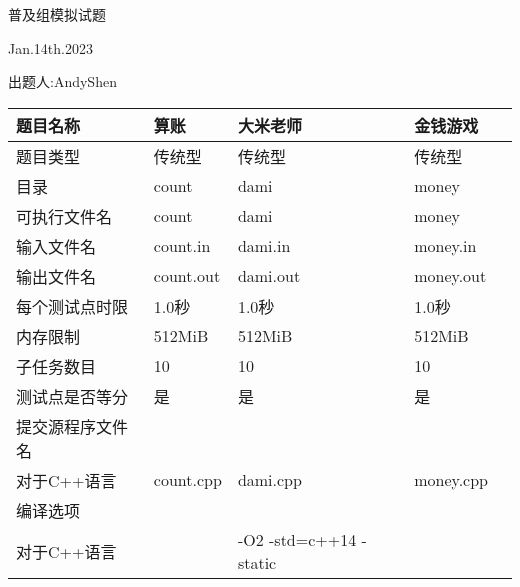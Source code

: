 \documentclass[final,11pt,oneside,UTF8]{report}
\begin{document}
\centerline{\LARGE{普及组模拟试题}}
\centerline{}
\centerline{\LARGE{Jan.14th.2023}}
\centerline{}
\centerline{出题人:AndyShen}
\centerline{}
\begin{table}[h]
    \centering
    \begin{tabular}{lllll}
        \hline
        \multicolumn{1}{|l|}{题目名称}    & \multicolumn{1}{l|}{算账}        & \multicolumn{1}{l|}{大米老师}                  & \multicolumn{1}{l|}{金钱游戏}      \\ \hline
        \multicolumn{1}{|l|}{题目类型}    & \multicolumn{1}{l|}{传统型}       & \multicolumn{1}{l|}{传统型}                   & \multicolumn{1}{l|}{传统型}       \\ \hline
        \multicolumn{1}{|l|}{目录}      & \multicolumn{1}{l|}{count}     & \multicolumn{1}{l|}{dami}                  & \multicolumn{1}{l|}{money}     \\ \hline
        \multicolumn{1}{|l|}{可执行文件名}  & \multicolumn{1}{l|}{count}     & \multicolumn{1}{l|}{dami}                  & \multicolumn{1}{l|}{money}     \\ \hline
        \multicolumn{1}{|l|}{输入文件名}   & \multicolumn{1}{l|}{count.in}  & \multicolumn{1}{l|}{dami.in}               & \multicolumn{1}{l|}{money.in}  \\ \hline
        \multicolumn{1}{|l|}{输出文件名}   & \multicolumn{1}{l|}{count.out} & \multicolumn{1}{l|}{dami.out}              & \multicolumn{1}{l|}{money.out} \\ \hline
        \multicolumn{1}{|l|}{每个测试点时限} & \multicolumn{1}{l|}{1.0秒}      & \multicolumn{1}{l|}{1.0秒}                  & \multicolumn{1}{l|}{1.0秒}      \\ \hline
        \multicolumn{1}{|l|}{内存限制}    & \multicolumn{1}{l|}{512MiB}    & \multicolumn{1}{l|}{512MiB}                & \multicolumn{1}{l|}{512MiB}    \\ \hline
        \multicolumn{1}{|l|}{子任务数目}   & \multicolumn{1}{l|}{10}        & \multicolumn{1}{l|}{10}                    & \multicolumn{1}{l|}{10}        \\ \hline
        \multicolumn{1}{|l|}{测试点是否等分} & \multicolumn{1}{l|}{是}         & \multicolumn{1}{l|}{是}                     & \multicolumn{1}{l|}{是}         \\ \hline
        提交源程序文件名                      &                                &                                            &                                \\ \hline
        \multicolumn{1}{|l|}{对于C++语言} & \multicolumn{1}{l|}{count.cpp} & \multicolumn{1}{l|}{dami.cpp}              & \multicolumn{1}{l|}{money.cpp} \\ \hline
        编译选项                          &                                &                                            &                                \\ \hline
        \multicolumn{1}{|l|}{对于C++语言} & \multicolumn{1}{l}{}           & \multicolumn{1}{l}{-O2 -std=c++14 -static} & \multicolumn{1}{l|}{}          \\ \hline
    \end{tabular}
\end{table}
\end{document}
